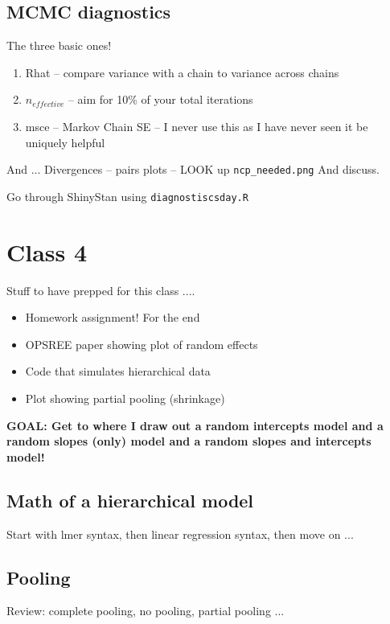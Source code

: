 \documentclass[11pt]{article}
\begin{document}
\subsection{MCMC diagnostics}

The three basic ones!
\begin{enumerate}
\item Rhat -- compare variance with a chain to variance across chains
\item $n_{effective}$ -- aim for 10\% of your total iterations 
\item msce -- Markov Chain SE -- I never use this as I have never seen it be uniquely helpful
\end{enumerate}

And ... Divergences -- pairs plots -- LOOK up \verb|ncp_needed.png| And discuss.

Go through ShinyStan using \verb|diagnostiscsday.R| 



\newpage
\section{Class 4} 

Stuff to have prepped for this class .... 
\begin{itemize}
\item Homework assignment! For the end
\item OPSREE paper showing plot of random effects
\item Code that simulates hierarchical data
\item Plot showing partial pooling (shrinkage)
\end{itemize}

{\bf GOAL: Get to where I draw out a random intercepts model and a random slopes (only) model and a random slopes and intercepts model!}

\subsection{Math of a hierarchical model}

Start with lmer syntax, then linear regression syntax, then move on ... 

\subsection{Pooling} %
Review: complete pooling, no pooling, partial pooling ... 
\end{document}
